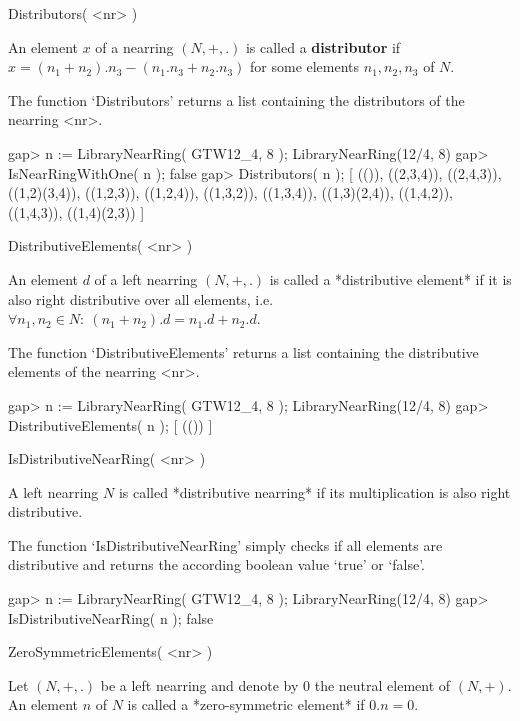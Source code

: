 

\>Distributors( <nr> )

An element $x$ of a nearring $(N,+,.)$ is called a {\bf distributor}
if $x = (n_1 + n_2 ) . n_3 - (n_1 . n_3 + n_2 . n_3 )$ for some elements
$n_1, n_2, n_3$ of $N$.

The function `Distributors' returns a list containing the distributors 
of the nearring <nr>. 

\beginexample
    gap> n := LibraryNearRing( GTW12_4, 8 );             
    LibraryNearRing(12/4, 8)
    gap> IsNearRingWithOne( n );
    false
    gap> Distributors( n );
    [ (()), ((2,3,4)), ((2,4,3)), ((1,2)(3,4)), ((1,2,3)), ((1,2,4)), 
      ((1,3,2)), ((1,3,4)), ((1,3)(2,4)), ((1,4,2)), ((1,4,3)), 
      ((1,4)(2,3)) ]
\endexample

\>DistributiveElements( <nr> )

An element $d$ of a left nearring $(N,+,.)$ is called a 
*distributive element* if it is also right distributive over all elements,
i.e. $\forall n_1, n_2 \in N:\ (n_1 + n_2 ).d = n_1.d + n_2.d$. 

The function `DistributiveElements' returns a list containing the 
distributive elements of the nearring <nr>. 

\beginexample
    gap> n := LibraryNearRing( GTW12_4, 8 );            
    LibraryNearRing(12/4, 8)
    gap> DistributiveElements( n );
    [ (()) ]
\endexample

\>IsDistributiveNearRing( <nr> )

A left nearring $N$ is called *distributive nearring* if its
multiplication is also right distributive.

The function `IsDistributiveNearRing' simply checks if all elements
are distributive and returns the according boolean value 
`true' or `false'.

\beginexample
    gap> n := LibraryNearRing( GTW12_4, 8 );            
    LibraryNearRing(12/4, 8)
    gap> IsDistributiveNearRing( n );
    false
\endexample



\>ZeroSymmetricElements( <nr> )

Let $(N,+,.)$ be a left nearring and denote by $0$ the neutral element 
of $(N,+)$. 
An element $n$ of $N$ is called a *zero-symmetric element* if $0.n = 0$. 


